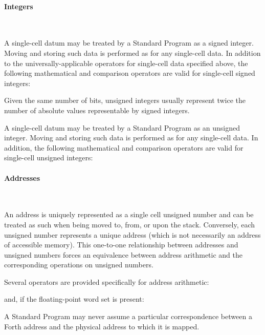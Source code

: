 \paragraph{Integers} ~ %

A single-cell datum may be treated by a Standard Program as a signed
integer. Moving and storing such data is performed as for any
single-cell data. In addition to the universally-applicable operators
for single-cell data specified above, the following mathematical and
comparison operators are valid for single-cell signed integers:


Given the same number of bits, unsigned integers usually represent
twice the number of absolute values representable by signed integers.

A single-cell datum may be treated by a Standard Program as an
unsigned integer. Moving and storing such data is performed as for
any single-cell data. In addition, the following mathematical and
comparison operators are valid for single-cell unsigned integers:
\begin{quote}\ttfamily
			\word{+}	\word{+!}
	\word{-}				\word{*}
		
\end{quote}


\paragraph{Addresses} ~ %

An address is uniquely represented as a single cell unsigned number
and can be treated as such when being moved to, from, or upon the
stack. Conversely, each unsigned number represents a unique address
(which is not necessarily an address of accessible memory). This
one-to-one relationship between addresses and unsigned numbers forces
an equivalence between address arithmetic and the corresponding
operations on unsigned numbers.

Several operators are provided specifically for address arithmetic:
\begin{quote}\ttfamily
		
		
\end{quote}
and, if the floating-point word set is present:
\begin{quote}\ttfamily
			
		
		
\end{quote}
A Standard Program may never assume a particular correspondence
between a Forth address and the physical address to which it is
mapped.


